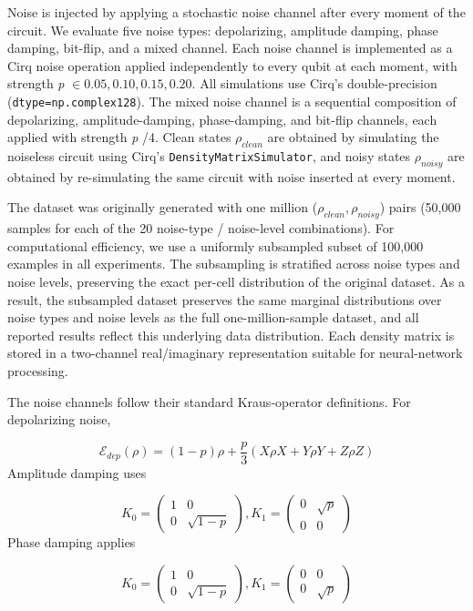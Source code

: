 \documentclass[a4paper, 11pt, colorlinks=true, citecolor=., linkcolor=black, urlcolor=black]{article}
\begin{document}
Noise is injected by applying a stochastic noise channel after every moment of the circuit. We evaluate five noise types: depolarizing, amplitude damping, phase damping, bit-flip, and a mixed channel. Each noise channel is implemented as a Cirq\autocite{CirqDevelopers_2025} noise operation applied independently to every qubit at each moment, with strength \emph{p} \(\in {0.05, 0.10, 0.15, 0.20}\). All simulations use Cirq's double-precision (\texttt{dtype=np.complex128}). The mixed noise channel is a sequential composition of depolarizing, amplitude-damping, phase-damping, and bit-flip channels, each applied with strength \emph{p} /4. Clean states \(\rho_{clean}\) are obtained by simulating the noiseless circuit using Cirq's \texttt{DensityMatrixSimulator}, and noisy states \(\rho_{noisy}\) are obtained by re-simulating the same circuit with noise inserted at every moment.

The dataset was originally generated with one million (\(\rho_{clean}, \rho_{noisy}\)) pairs (50,000 samples for each of the 20 noise-type / noise-level combinations). For computational efficiency, we use a uniformly subsampled subset of 100,000 examples in all experiments. The subsampling is stratified across noise types and noise levels, preserving the exact per-cell distribution of the original dataset. As a result, the subsampled dataset preserves the same marginal distributions over noise types and noise levels as the full one-million-sample dataset, and all reported results reflect this underlying data distribution. Each density matrix is stored in a two-channel real/imaginary representation suitable for neural-network processing.


The noise channels follow their standard Kraus-operator definitions\autocite{nielsen_chuang_2010}. For depolarizing noise,

$$
\mathcal{E}_{dep}(\rho) = (1-p)\rho + \frac{p}{3}(X \rho X + Y \rho Y + Z \rho Z)
$$
Amplitude damping uses

$$
K_0 = \begin{pmatrix}
1 & 0\\
0 & \sqrt{1-p}
\end{pmatrix}, 
 K_1 = \begin{pmatrix}
0 & \sqrt{p}\\
0 & 0
\end{pmatrix}
$$
Phase damping applies

$$
K_0 = \begin{pmatrix}
1 & 0\\
0 & \sqrt{1-p}
\end{pmatrix},
K_1 = \begin{pmatrix}
0 & 0\\
0 & \sqrt{p}
\end{pmatrix}
$$
\end{document}
